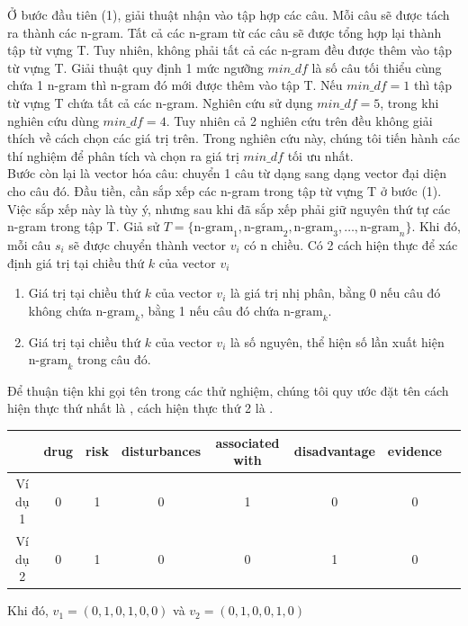 Ở bước đầu tiên (1), giải thuật nhận vào tập hợp các câu. Mỗi câu sẽ được tách ra thành các n-gram. Tất cả các n-gram từ các câu sẽ được tổng hợp lại thành tập từ vựng T. Tuy nhiên, không phải tất cả các n-gram đều được thêm vào tập từ vựng T. Giải thuật quy định 1 mức ngưỡng $min\_df$ là số câu tối thiểu cùng chứa 1 n-gram thì n-gram đó mới được thêm vào tập T. Nếu $min\_df=1$ thì tập từ vựng T chứa tất cả các n-gram. Nghiên cứu \cite{sarker2011outcome} sử dụng $min\_df = 5$, trong khi nghiên cứu \cite{niu2005analysis} dùng $min\_df=4$. Tuy nhiên cả 2 nghiên cứu trên đều không giải thích về cách chọn các giá trị trên. Trong nghiên cứu này, chúng tôi tiến hành các thí nghiệm để phân tích và chọn ra giá trị $min\_df$ tối ưu nhất.\\

Bước còn lại là vector hóa câu: chuyển 1 câu từ dạng  sang dạng vector đại diện cho câu đó. Đầu tiền, cần sắp xếp các n-gram trong tập từ vựng T ở bước (1). Việc sắp xếp này là tùy ý, nhưng sau khi đã sắp xếp phải giữ nguyên thứ tự các n-gram trong tập T. Giả sử $T=\{\text{n-gram}_1, \text{n-gram}_2, \text{n-gram}_3, \ldots, \text{n-gram}_n\}$. Khi đó, mỗi câu $s_i$ sẽ được chuyển thành vector $v_i$ có n chiều. Có 2 cách hiện thực để xác định giá trị tại chiều thứ $k$ của vector $v_i$
\begin{enumerate}
\item Giá trị tại chiều thứ $k$ của vector $v_i$ là giá trị nhị phân, bằng 0 nếu câu đó không chứa $\text{n-gram}_k$, bằng 1 nếu câu đó chứa $\text{n-gram}_k$.
\item Giá trị tại chiều thứ $k$ của vector $v_i$ là số nguyên, thể hiện số lần xuất hiện $\text{n-gram}_k$ trong câu đó.
\end{enumerate}
Để thuận tiện khi gọi tên trong các thử nghiệm, chúng tôi quy ước đặt tên cách hiện thực thứ nhất là , cách hiện thực thứ 2 là . \\
\begin{tabular}{| c | c | c | c | c | c | c | c |}
\hline
  & \textbf{drug} & \textbf{risk} & \textbf{disturbances} & \textbf{associated with} & \textbf{disadvantage} & \textbf{evidence}
\\ \hline
Ví dụ 1 & 0 & 1 & 0 & 1 & 0 & 0
\\ \hline
Ví dụ 2 & 0 & 1 & 0 & 0 & 1 & 0
\\ \hline
\end{tabular}
Khi đó, $v_1 = (0, 1, 0, 1, 0, 0) $ và $v_2=(0, 1, 0, 0, 1, 0)$

